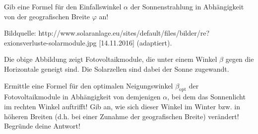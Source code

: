 \begin{langesbeispiel}
\begin{enumerate}
Gib eine Formel für den Einfallswinkel $\alpha$ der Sonnenstrahlung in Abhängigkeit von der geografischen Breite $\varphi$ an!

\begin{center}
\end{center}
\begin{scriptsize}\begin{singlespace}Bildquelle: http://www.solaranlage.eu/sites/default/files/bilder/re?exionsverluste-solarmodule.jpg [14.11.2016] (adaptiert).\end{singlespace}
\end{scriptsize}

Die obige Abbildung zeigt Fotovoltaikmodule, die unter einem Winkel $\beta$ gegen die Horizontale geneigt sind. Die Solarzellen sind dabei der Sonne zugewandt.\leer

Ermittle eine Formel für den optimalen Neigungswinkel $\beta_\text{opt}$ der Fotovoltaikmodule in Abhängigkeit von demjenigen $\alpha$, bei dem das Sonnenlicht im rechten Winkel auftrifft! Gib an, wie sich dieser Winkel im Winter bzw. in höheren Breiten (d.h. bei einer Zunahme der geografischen Breite) verändert! Begründe deine Antwort!   



\end{enumerate}

\end{langesbeispiel}
